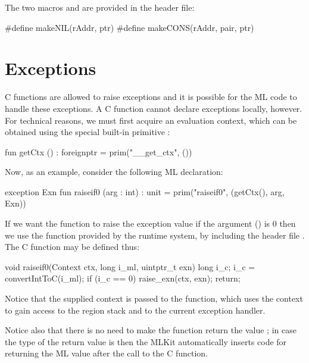\documentclass[12pt]{book}
\begin{document}
The two macros  and  are provided in the 
header file:
%
%
%
%
\begin{scriptcode}
  #define makeNIL(rAddr, ptr)
  #define makeCONS(rAddr, pair, ptr)
\end{scriptcode}

\section{Exceptions}
\label{C_exceptions.sec}
C functions are allowed to raise exceptions and it is possible for the ML code
to handle these exceptions. A C function cannot declare exceptions locally,
however. For technical reasons, we must first acquire an
%
%
%
evaluation context, which can be obtained using the special built-in primitive
:
\begin{smlcode}
  fun getCtx () : foreignptr =
    prim("__get_ctx", ())
\end{smlcode}

\noindent
Now, as an example, consider the following ML declaration:
\begin{smlcode}
  exception Exn
  fun raiseif0 (arg : int) : unit =
    prim("raiseif0", (getCtx(), arg, Exn))
\end{smlcode}
If we want the function  to raise the exception value  if
the argument () is 0 then we use the function  provided
by the runtime system, by including the header file
. The C function  may be defined thus:
\begin{scriptcode}
  void raiseif0(Context ctx, long i_ml, uintptr_t exn) {
    long i_c;
    i_c = convertIntToC(i_ml);
    if (i_c == 0) raise_exn(ctx, exn);
    return;
  }
\end{scriptcode}
Notice that the supplied context is passed to the  function,
which uses the context to gain access to the region stack and to the current
exception handler.

Notice also that there is no need to make the function  return the
value ; in case the type of the return value is  then the
MLKit automatically inserts code for returning the ML value \kw{()} after the
call to the C function.
\end{document}
